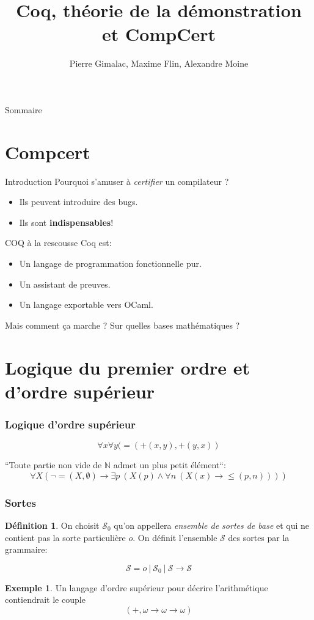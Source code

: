 \documentclass[11pt,a4paper]{beamer}
\title{Coq, théorie de la démonstration et CompCert}
\author{Pierre Gimalac, Maxime Flin, Alexandre Moine}
\theoremstyle{plain}
\theoremstyle{definition}
\newtheorem{defn}{Définition}[section]
\newtheorem{exmp}{Exemple}[section]
\theoremstyle{remark}
\begin{document}
\maketitle

\begin{frame}{Sommaire}
\tableofcontents
\end{frame}

\section{Compcert}

\begin{frame}{Introduction}
Pourquoi s'amuser à \textit{certifier} un compilateur ?
\begin{itemize}
	\item Ils peuvent introduire des bugs.
	\item Ils sont \textbf{indispensables}!
\end{itemize}
\end{frame}

\begin{frame}{COQ à la rescousse}
Coq est:
\begin{itemize}
\item Un langage de programmation fonctionnelle pur.
\item Un assistant de preuves.
\item Un langage exportable vers OCaml.
\end{itemize}
Mais comment ça marche ? Sur quelles bases mathématiques ?
\end{frame}

\section{Logique du premier ordre et d'ordre supérieur}
\begin{frame}
\frametitle{Logique d'ordre supérieur}
$$\forall x\forall y (=(+(x,y),+(y,x))$$

``Toute partie non vide de $\mathbb{N}$ admet un plus petit élément``:
\[ \forall X \left(\neg =(X, \emptyset)\rightarrow\exists p~(X(p)\wedge\forall n~(X(x)\rightarrow \leq(p, n)))\right)\]
\end{frame}

\begin{frame}
\frametitle{Sortes}
\begin{defn}
On choisit $\mathcal{S}_0$ qu'on appellera \textit{ensemble de sortes de base} et qui ne contient pas la sorte particulière $o$. On définit l'ensemble $\mathcal{S}$ des sortes par la grammaire:

\[ \mathcal{S} = o~|~\mathcal{S}_0~|~\mathcal{S}\rightarrow\mathcal{S} \]
\end{defn}

\begin{exmp}
Un langage d'ordre supérieur pour décrire l'arithmétique contiendrait le couple
\[ \left(+, \omega \rightarrow \omega \rightarrow \omega\right) \]
\end{exmp}
\end{frame}
\end{document}
